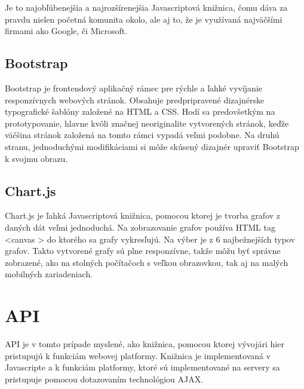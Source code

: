 Je to najobľúbenejšia a najrozšírenejšia Javascriptová knižnica, čomu dáva za pravdu nielen početná komunita okolo, ale aj to, že je využívaná najväčšími firmami ako Google, či Microsoft.

\subsection{Bootstrap}
\label{sec:bootstrap}
Bootstrap je frontendový aplikačný rámec pre rýchle a ľahké vyvíjanie responzívnych webových stránok. Obsahuje predpripravené dizajnérske typografické šablóny založené na HTML a CSS. Hodí sa predovšetkým na prototypovanie, hlavne kvôli značnej neoriginalite vytvorených stránok, keďže väčšina stránok založená na tomto rámci vypadá veľmi podobne. Na druhú stranu, jednoduchými modifikáciami si môže skúsený dizajnér upraviť Bootstrap k svojmu obrazu.   

\subsection{Chart.js}
\label{sec:chartjs}
Chart.js je ľahká Javascriptová knižnica, pomocou ktorej je tvorba grafov z daných dát veľmi jednoduchá. Na zobrazovanie grafov používa HTML tag <canvas > do ktorého sa grafy vykresľujú. Na výber je z 6 najbežnejších typov grafov. Takto vytvorené grafy sú plne responzívne, takže môžu byť správne zobrazené, ako na stolných počítačoch s veľkou obrazovkou, tak aj na malých mobilných zariadeniach.

\section{API}
\label{sec:api}
API je v tomto prípade myslené, ako knižnica, pomocou ktorej vývojári hier pristupujú k funkciám webovej platformy. Knižnica je implementovaná v Javascripte a k funkciám platformy, ktoré sú implementované na servery sa pristupuje pomocou dotazovaním technológiou AJAX.

